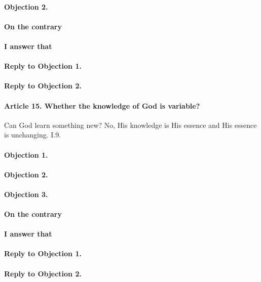 \documentclass{ucetd}
\begin{document}
\paragraph{Objection 2.}
\paragraph{On the contrary}
\paragraph{I answer that}
\paragraph{Reply to Objection 1.}
\paragraph{Reply to Objection 2.}

\paragraph{Article 15. Whether the knowledge of God is variable?}
Can God learn something new? No, His knowledge is His essence and His essence is unchanging. I.9.
\paragraph{Objection 1.}
\paragraph{Objection 2.}
\paragraph{Objection 3.}
\paragraph{On the contrary}
\paragraph{I answer that}
\paragraph{Reply to Objection 1.}
\paragraph{Reply to Objection 2.}
\end{document}

